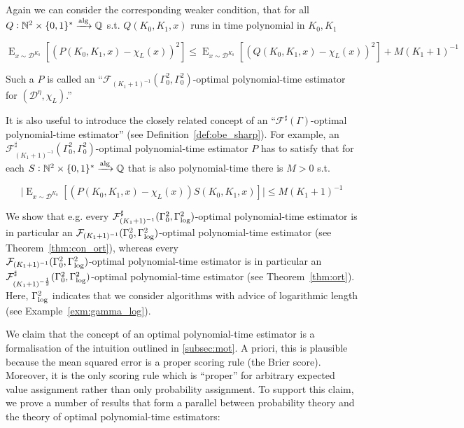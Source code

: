 \documentclass[11pt]{article}
\numberwithin{equation}{section}
\theoremstyle{definition}
\theoremstyle{plain}
\newcommand{\Bool}{\{0,1\}}
\newcommand{\Words}{{\Bool^*}}
\DeclareMathOperator{\E}{E}
\newcommand{\Nats}{\mathbb{N}}
\newcommand{\Rats}{\mathbb{Q}}
\newcommand{\Abs}[1]{\lvert #1 \rvert}
\newcommand{\Dist}{\mathcal{D}}
\newcommand{\Fall}{\mathcal{F}}
\newcommand{\ESG}{\Fall^\sharp(\Gamma)}
\newcommand{\GammaLog}{\Gamma_{\textnormal{log}}}
\newcommand{\Alg}{\xrightarrow{\textnormal{alg}}}
\begin{document}
Again we can consider the corresponding weaker condition, that for all ${Q: \Nats^2 \times \Words \Alg \Rats}$ s.t. ${Q(K_0,K_1,x)}$ runs in time polynomial in ${K_0,K_1}$

\[\E_{x \sim \Dist^{K_0}}[(P(K_0,K_1,x)-\chi_L(x))^2] \leq \E_{x \sim \Dist^{K_0}}[(Q(K_0,K_1,x)-\chi_L(x))^2] + M (K_1+1)^{-1}\]

Such a ${P}$ is called an \enquote{${\Fall_{(K_1+1)^{-1}}(\Gamma_0^2,\Gamma_0^2)}$-optimal polynomial-time estimator for ${(\Dist^\eta,\chi_L)}$.}

It is also useful to introduce the closely related concept of an \enquote{${\ESG}$-optimal polynomial-time estimator} (see Definition~\ref{def:obe_sharp}). For example, an ${\Fall_{(K_1+1)^{-1}}^\sharp(\Gamma_0^2,\Gamma_0^2)}$-optimal polynomial-time estimator ${P}$ has to satisfy that for each ${S: \Nats^2 \times \Words \Alg \Rats}$ that is also polynomial-time there is ${M > 0}$ s.t.

\[\Abs{\E_{x \sim \Dist^{K_0}}[(P(K_0,K_1,x)-\chi_L(x))S(K_0,K_1,x)]} \leq M (K_1+1)^{-1}\]

We show that e.g. every ${\Fall_{(K_1+1)^{-1}}^\sharp(\Gamma_0^2,\GammaLog^2)}$-optimal polynomial-time estimator is in particular an ${\Fall_{(K_1+1)^{-1}}(\Gamma_0^2,\GammaLog^2)}$-optimal polynomial-time estimator (see Theorem~\ref{thm:con_ort}), whereas every\\ ${\Fall_{(K_1+1)^{-1}}(\Gamma_0^2,\GammaLog^2)}$-optimal polynomial-time estimator is in particular an ${\Fall_{(K_1+1)^{-\frac{1}{2}}}^\sharp(\Gamma_0^2,\GammaLog^2)}$-optimal polynomial-time estimator (see Theorem~\ref{thm:ort}). Here, ${\GammaLog^2}$ indicates that we consider algorithms with advice of logarithmic length (see Example~\ref{exm:gamma_log}).

We claim that the concept of an optimal polynomial-time estimator is a formalisation of the intuition outlined in \ref{subsec:mot}. A priori, this is plausible because the mean squared error is a proper scoring rule (the Brier score). Moreover, it is the only scoring rule which is \enquote{proper} for arbitrary expected value assignment rather than only probability assignment. To support this claim, we prove a number of results that form a parallel between probability theory and the theory of optimal polynomial-time estimators:
\end{document}
